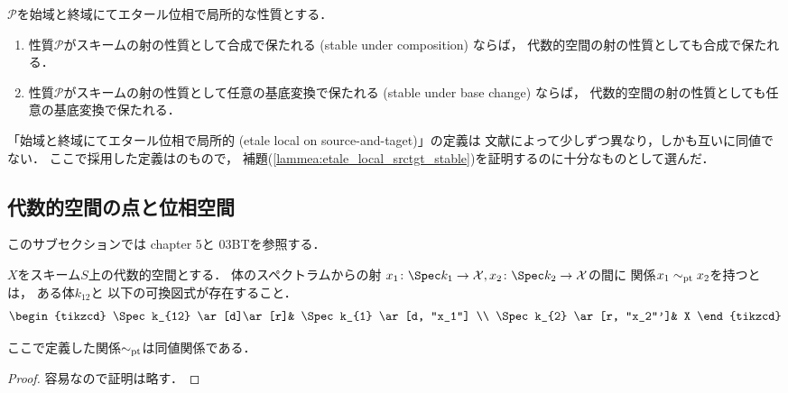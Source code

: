     \begin{Lemma}\label{lammea:etale_local_srctgt_stable}
        $\mathcal{P}$を始域と終域にてエタール位相で局所的な性質とする．
        \begin{enumerate}[label=(\roman*)]
        \item
            性質$\mathcal{P}$がスキームの射の性質として合成で保たれる (stable under composition) ならば，
            代数的空間の射の性質としても合成で保たれる．
        \item
            性質$\mathcal{P}$がスキームの射の性質として任意の基底変換で保たれる (stable under base change) ならば，
            代数的空間の射の性質としても任意の基底変換で保たれる．
        \end{enumerate}
    \end{Lemma}

    \begin{Remark}
        「始域と終域にてエタール位相で局所的 (etale local on source-and-taget)」の定義は
        文献によって少しずつ異なり，しかも互いに同値でない．
        ここで採用した定義は\cite{LMB}のもので，
        補題(\ref{lammea:etale_local_srctgt_stable})を証明するのに十分なものとして選んだ．
    \end{Remark}

\subsection{代数的空間の点と位相空間}
    このサブセクションでは\cite{LMB} chapter 5と\cite{SP} 03BTを参照する．

    \begin{Def}\label{def:pt_of_algsp}
        $X$をスキーム$S$上の代数的空間とする．
        体のスペクトラムからの射
        $x_1 \colon \Spec k_1 \to \stX, x_2 \colon \Spec k_2 \to \stX$の間に
        関係$x_1 \sim_{\mathrm{pt}} x_2$を持つとは，
        ある体$k_{12}$と
        以下の可換図式が存在すること．
        \[
        \begin{tikzcd}
            \Spec k_{12} \ar[d]\ar[r]& \Spec k_{1} \ar[d, "x_1"] \\
            \Spec k_{2} \ar[r, "x_2"']& X
        \end{tikzcd}
        \]
    \end{Def}

    \begin{Lemma}
        ここで定義した関係$\sim_{\mathrm{pt}}$は同値関係である．
    \end{Lemma}
    \begin{proof}
        容易なので証明は略す．
    \end{proof}

